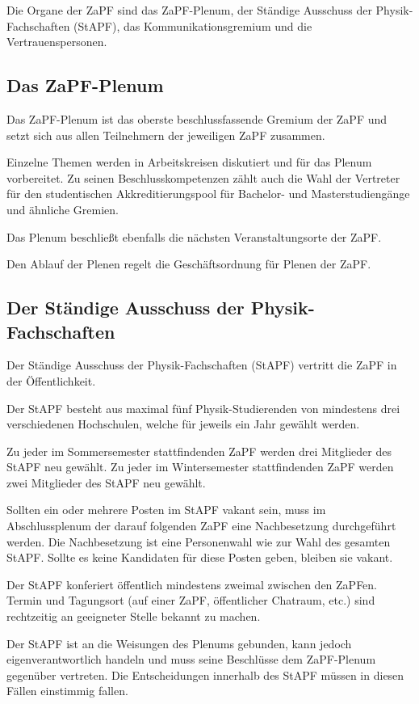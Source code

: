 \documentclass[draft,12pt,oneside]{scrreprt}
\begin{document}
Die Organe der ZaPF sind das ZaPF-Plenum, der Ständige Ausschuss der
Physik-Fachschaften (StAPF), das Kommunikationsgremium und die Vertrauenspersonen.

\subsection{Das ZaPF-Plenum}

Das ZaPF-Plenum ist das oberste beschlussfassende Gremium der ZaPF und setzt
sich aus allen Teilnehmern der jeweiligen ZaPF zusammen.

Einzelne Themen werden in Arbeitskreisen diskutiert und für das Plenum vorbereitet.
Zu seinen Beschlusskompetenzen zählt auch die Wahl der Vertreter für den
studentischen Akkreditierungspool für Bachelor- und Masterstudiengänge und
ähnliche Gremien.

Das Plenum beschließt ebenfalls die nächsten Veranstaltungsorte der ZaPF.

Den Ablauf der Plenen regelt die Geschäftsordnung für Plenen der ZaPF.

\subsection{Der Ständige Ausschuss der Physik-Fachschaften}

Der Ständige Ausschuss der Physik-Fachschaften (StAPF) vertritt die ZaPF in der
Öffentlichkeit.

Der StAPF besteht aus maximal fünf Physik-Studierenden von mindestens drei
verschiedenen Hochschulen, welche für jeweils ein Jahr gewählt werden.

Zu jeder im Sommersemester stattfindenden ZaPF werden drei Mitglieder des StAPF
neu gewählt.
Zu jeder im Wintersemester stattfindenden ZaPF werden zwei Mitglieder des StAPF
neu gewählt.

Sollten ein oder mehrere Posten im StAPF vakant sein, muss im Abschlussplenum der
darauf folgenden ZaPF eine Nachbesetzung durchgeführt werden.
Die Nachbesetzung ist eine Personenwahl wie zur Wahl des gesamten StAPF.
Sollte es keine Kandidaten für diese Posten geben, bleiben sie vakant.

Der StAPF konferiert öffentlich mindestens zweimal zwischen den ZaPFen.
Termin und Tagungsort (auf einer ZaPF, öffentlicher Chatraum, etc.) sind
rechtzeitig an geeigneter Stelle bekannt zu machen.

Der StAPF ist an die Weisungen des Plenums gebunden, kann jedoch
eigenverantwortlich handeln und muss seine Beschlüsse dem ZaPF-Plenum gegenüber
vertreten.
Die Entscheidungen innerhalb des StAPF müssen in diesen Fällen einstimmig fallen.
\end{document}
